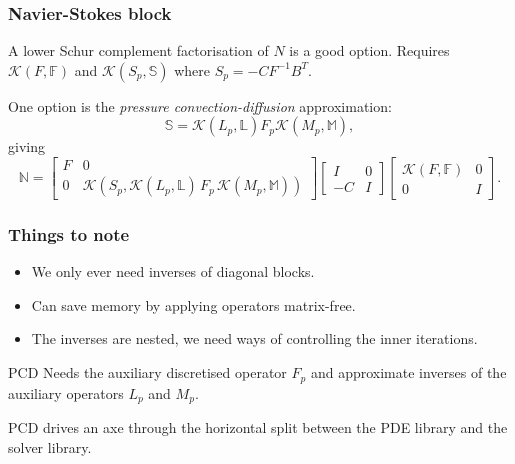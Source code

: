 \documentclass[presentation]{beamer}
\newcommand{\KSP}[2]{\ensuremath{\mathcal{K}\left(#1, \mathbb{#2}\right)}}
\newcommand{\ksp}[1]{\KSP{#1}{#1}}
\begin{document}
\begin{frame}
  \frametitle{Navier-Stokes block \parencite{Elman:2014}}
  A lower Schur complement factorisation of $N$ is a good option.
  Requires $\ksp{F}$ and $\KSP{S_p}{S}$ where $S_p = -C F^{-1} B^T$.

  One option is the \emph{pressure convection-diffusion}
  approximation:
  \begin{equation*}
    \mathbb{S} = \KSP{L_p}{L} F_p \KSP{M_p}{M},
  \end{equation*}
  giving
  \begin{equation*}
    \mathbb{N} = \begin{bmatrix}
      F & 0 \\
      0 & \mathcal{K}(S_p, \KSP{L_p}{L}\,F_p \, \KSP{M_p}{M})
    \end{bmatrix}
    \begin{bmatrix}
      I & 0\\
      -C & I
    \end{bmatrix}
    \begin{bmatrix}
      \ksp{F} & 0 \\
      0 & I
    \end{bmatrix}.
  \end{equation*}

\end{frame}

\begin{frame}
  \frametitle{Things to note}

  \begin{itemize}
  \item We only ever need inverses of diagonal blocks.
  \item Can save memory by applying operators matrix-free.
  \item The inverses are nested, we need ways of controlling the inner
    iterations.
  \end{itemize}

  \begin{block}{PCD}
    Needs the auxiliary discretised operator $F_p$ and approximate
    inverses of the auxiliary operators $L_p$ and $M_p$.

    PCD drives an axe through the horizontal split between
    the PDE library and the solver library.
  \end{block}
\end{frame}
\end{document}
